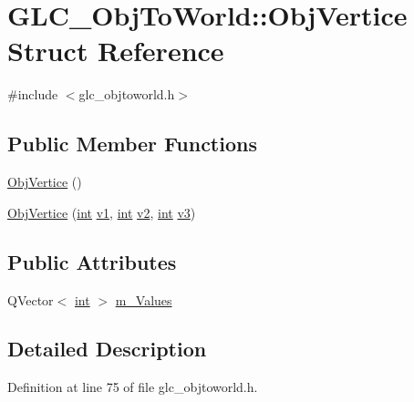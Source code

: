 \hypertarget{struct_g_l_c___obj_to_world_1_1_obj_vertice}{\section{G\-L\-C\-\_\-\-Obj\-To\-World\-:\-:Obj\-Vertice Struct Reference}
\label{struct_g_l_c___obj_to_world_1_1_obj_vertice}
}


{\ttfamily \#include $<$glc\-\_\-objtoworld.\-h$>$}

\subsection*{Public Member Functions}
\begin{DoxyCompactItemize}
\item 
\hyperlink{struct_g_l_c___obj_to_world_1_1_obj_vertice_a4d6db3a92bb9fe3a0fcdde8904855073}{Obj\-Vertice} ()
\item 
\hyperlink{struct_g_l_c___obj_to_world_1_1_obj_vertice_a55253d3e15d3d788fb86c4f3822ebeb8}{Obj\-Vertice} (\hyperlink{ioapi_8h_a787fa3cf048117ba7123753c1e74fcd6}{int} \hyperlink{glext_8h_aabdd9aabede45fcf97cea04f88d2ad60}{v1}, \hyperlink{ioapi_8h_a787fa3cf048117ba7123753c1e74fcd6}{int} \hyperlink{glext_8h_ae35401c8c2fcdcc48c20ba325ee473ea}{v2}, \hyperlink{ioapi_8h_a787fa3cf048117ba7123753c1e74fcd6}{int} \hyperlink{glext_8h_ac2343f93cabb4191bf67057b0d22167c}{v3})
\end{DoxyCompactItemize}
\subsection*{Public Attributes}
\begin{DoxyCompactItemize}
\item 
Q\-Vector$<$ \hyperlink{ioapi_8h_a787fa3cf048117ba7123753c1e74fcd6}{int} $>$ \hyperlink{struct_g_l_c___obj_to_world_1_1_obj_vertice_acb172a5bd9e66188b37b12ea38d5bf76}{m\-\_\-\-Values}
\end{DoxyCompactItemize}


\subsection{Detailed Description}


Definition at line 75 of file glc\-\_\-objtoworld.\-h.



